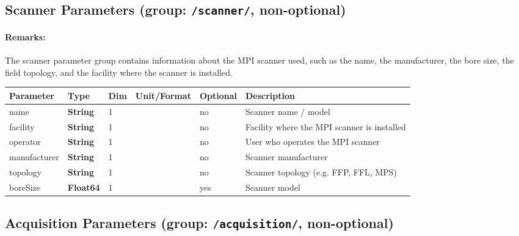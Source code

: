 \documentclass[landscape,a4paper]{article} %
\newcommand{\inl}[1]{\lstinline[columns=fixed]{#1}}
\newcommand{\inltab}[1]{{\ttfamily\bfseries\color{blue}#1}}
\newcommand{\inlvar}[1]{{\ttfamily#1}}
\begin{document}
\subsection{Scanner Parameters (group: \inl{/scanner/}, non-optional)}

\begin{multicols}{2}
\paragraph{Remarks:} The scanner parameter group contains information about the MPI scanner used, such as the name, the manufacturer, the bore size, the field topology, and the facility where the scanner is installed.
\end{multicols}

\noindent \begin{tabularx}{\columnwidth}{lllllX}
\noindent \textbf{Parameter} & \textbf{Type} & \textbf{Dim} & \textbf{Unit/Format} & \textbf{Optional} & \textbf{Description} \\ \hline 
\inlvar{name} & \inltab{String} & 1 & & no & Scanner name / model \\ \hline 
\inlvar{facility} & \inltab{String} & 1 & & no & Facility where the MPI scanner is installed \\ \hline 
\inlvar{operator} & \inltab{String} & 1 & & no & User who operates the MPI scanner \\ \hline 
\inlvar{manufacturer} & \inltab{String} & 1 & & no & Scanner manufacturer \\ \hline 
\inlvar{topology} & \inltab{String} & 1 & & no & Scanner topology (e.g. FFP, FFL, MPS)\\ \hline 
\inlvar{boreSize} & \inltab{Float64} & 1 & & yes & Scanner model \\ \hline 
\end{tabularx}


\subsection{Acquisition Parameters (group: \inl{/acquisition/}, non-optional)}
\end{document}
